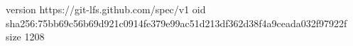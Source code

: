 version https://git-lfs.github.com/spec/v1
oid sha256:75bb69c56b69d921c0914fe379e99ac51d213df362d38f4a9ceada032f97922f
size 1208
